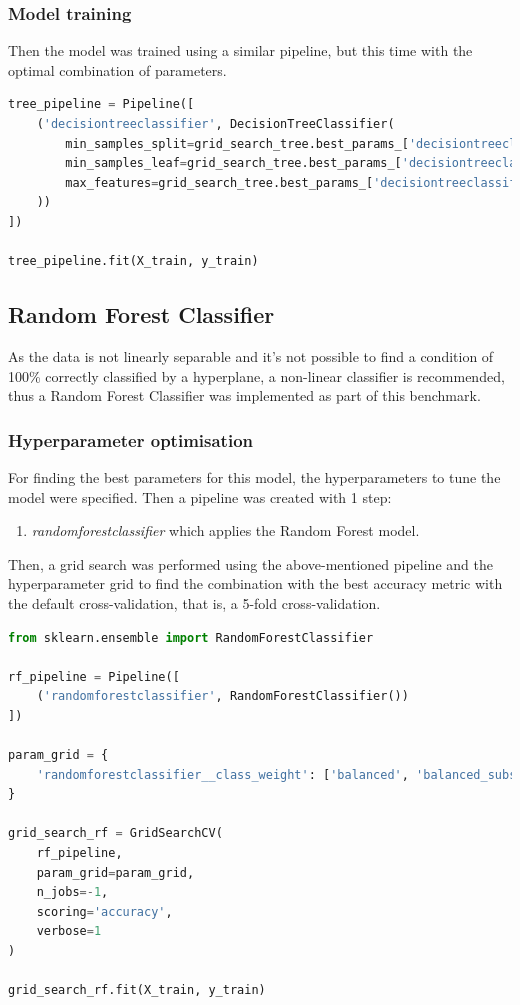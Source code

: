 \documentclass{article}
\begin{document}
\subsubsection{Model training}
Then the model was trained using a similar pipeline, but this time with the optimal combination of parameters.

\begin{lstlisting}[language=Python]
tree_pipeline = Pipeline([
    ('decisiontreeclassifier', DecisionTreeClassifier(
        min_samples_split=grid_search_tree.best_params_['decisiontreeclassifier__min_samples_split'],
        min_samples_leaf=grid_search_tree.best_params_['decisiontreeclassifier__min_samples_leaf'],
        max_features=grid_search_tree.best_params_['decisiontreeclassifier__max_features']
    ))
])

tree_pipeline.fit(X_train, y_train)
\end{lstlisting}

\subsection{Random Forest Classifier} 
As the data is not linearly separable and it's not possible to find a condition of 100\% correctly classified by a hyperplane, a non-linear classifier is recommended, thus a Random Forest Classifier was implemented as part of this benchmark.

\subsubsection{Hyperparameter optimisation}
For finding the best parameters for this model, the hyperparameters to tune the model were specified. Then a pipeline was created with 1 step:
\begin{enumerate}
\item \emph{randomforestclassifier} which applies the Random Forest model.
\end{enumerate}

Then, a grid search was performed using the above-mentioned pipeline and the hyperparameter grid to find the combination with the best accuracy metric with the default cross-validation, that is, a 5-fold cross-validation.
\begin{lstlisting}[language=Python]
from sklearn.ensemble import RandomForestClassifier

rf_pipeline = Pipeline([
    ('randomforestclassifier', RandomForestClassifier())
])

param_grid = {
    'randomforestclassifier__class_weight': ['balanced', 'balanced_subsample']
}

grid_search_rf = GridSearchCV(
    rf_pipeline,
    param_grid=param_grid,
    n_jobs=-1,
    scoring='accuracy',
    verbose=1
)

grid_search_rf.fit(X_train, y_train)
\end{lstlisting}
\end{document}

